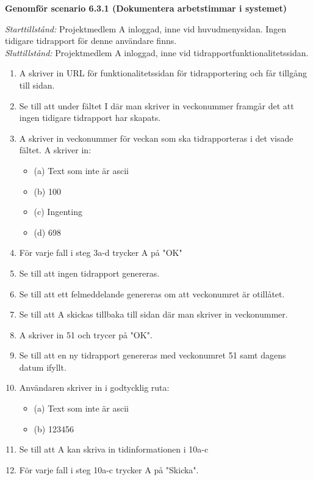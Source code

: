 \documentclass[a4paper]{article}
\begin{document}
\begin{ST}




\item
\textbf{Genomför scenario 6.3.1 (Dokumentera arbetstimmar i systemet)}

\emph{Starttillstånd:} Projektmedlem A inloggad, inne vid huvudmenysidan. Ingen tidigare tidrapport för denne användare finns.\\
\emph{Sluttillstånd:} Projektmedlem A inloggad, inne vid tidrapportfunktionalitetssidan.\\

\begin{enumerate}
\item A skriver in URL för funktionalitetssidan för tidrapportering och får tillgång till sidan.
\item Se till att under fältet I där man skriver in veckonummer framgår det att ingen tidigare tidrapport har skapats.
\item A skriver in veckonummer för veckan som ska tidrapporteras i det visade fältet. A skriver in:
\begin{itemize}
\item[] (a) Text som inte är ascii
\item[] (b) 100
\item[] (c) Ingenting
\item[] (d) 698
\end{itemize}
\item För varje fall i steg 3a-d trycker A på "OK"
\item Se till att ingen tidrapport genereras.
\item Se till att ett felmeddelande genereras om att veckonumret är otillåtet.
\item Se till att A skickas tillbaka till sidan där man skriver in veckonummer.
\item A skriver in 51 och trycer på "OK".
\item Se till att en ny tidrapport genereras med veckonumret 51 samt dagens datum ifyllt.
\item Användaren skriver in i godtycklig ruta:
\begin{itemize}
\item[] (a) Text som inte är ascii
\item[] (b) 123456
\end{itemize}
\item Se till att A kan skriva in tidinformationen i 10a-c
\item För varje fall i steg 10a-c trycker A på "Skicka". 

\end{enumerate}
\end{ST}
\end{document}
